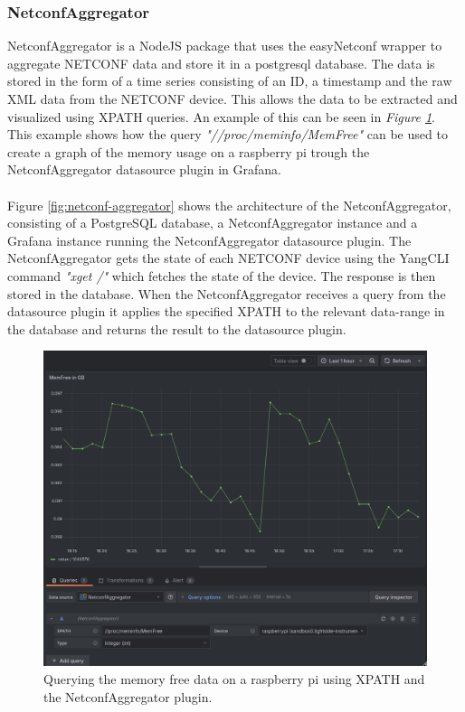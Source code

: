 \documentclass[12pt]{article}
\begin{document}
\subsubsection{NetconfAggregator}
NetconfAggregator is a NodeJS package that uses the easyNetconf wrapper 
\cite{heimonenSlenderman00Netconfaggregator2025} to aggregate NETCONF data and store 
it in a postgresql database. The data is stored in the form of a time series consisting of an ID, a timestamp and the 
raw XML data from the NETCONF device. This allows the data to be extracted and visualized using XPATH queries.
An example of this can be seen in \textit{Figure \ref{fig:netconf-aggregator-memfree}}.
This example shows how the query \textit{"//proc/meminfo/MemFree"} can be used to create a graph of the memory usage 
on a raspberry pi trough the NetconfAggregator datasource plugin in Grafana.
\\
\\
Figure \ref{fig:netconf-aggregator} shows the architecture of the NetconfAggregator, consisting
of a PostgreSQL database, a NetconfAggregator instance and a Grafana instance running the NetconfAggregator datasource plugin.
The NetconfAggregator gets the state of each NETCONF device using the YangCLI command \textit{"xget /"} which
fetches the state of the device. The response is then stored in the database.
When the NetconfAggregator receives a query from the datasource plugin it applies the specified XPATH to 
the relevant data-range in the database and returns the result to the datasource plugin.

\begin{figure}
  \centering
  \includegraphics[width=\textwidth]{memfree.png}
  \caption{Querying the memory free data on a raspberry pi using XPATH and the NetconfAggregator plugin.}
  \label{fig:netconf-aggregator-memfree}
\end{figure}
\end{document}
